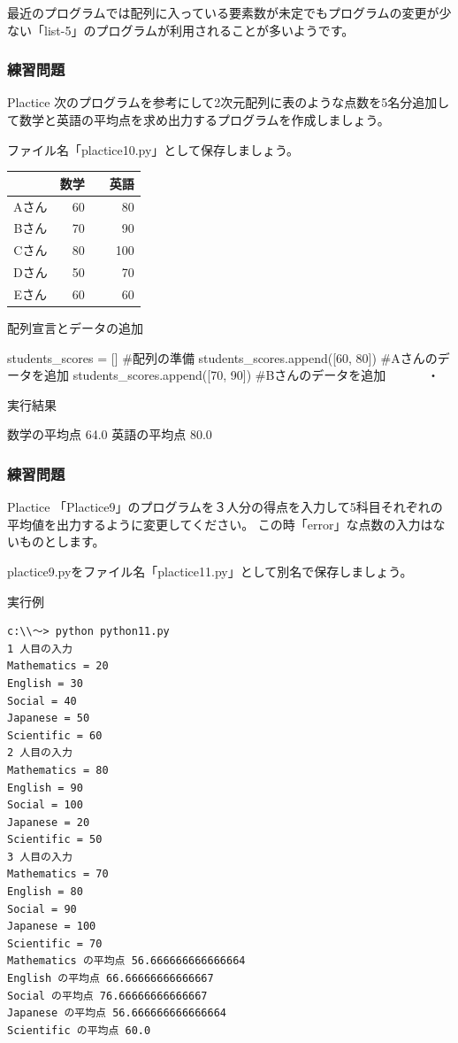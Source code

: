\documentclass[11pt,a4paper,dvipdfmx,titlepage]{jsreport}
\begin{document}
最近のプログラムでは配列に入っている要素数が未定でもプログラムの変更が少ない「list-5」のプログラムが利用されることが多いようです。
\subsubsection{練習問題}
\begin{plabox}{Plactice}
次のプログラムを参考にして2次元配列に表のような点数を5名分追加して数学と英語の平均点を求め出力するプログラムを作成しましょう。

ファイル名「plactice10.py」として保存しましょう。
\begin{center}
\begin{tabular}{|c|r|r|} 
\hline
 & 数学 &　英語 \\ \hline \hline
 Aさん &  60& 80  \\ \hline
 Bさん &  70& 90  \\ \hline
 Cさん &  80& 100  \\ \hline
 Dさん &  50& 70  \\ \hline
 Eさん &  60& 60  \\ \hline
\end{tabular}
\end{center}

\begin{codebox}{配列宣言とデータの追加}
\begin{listing}{1}
students_scores = []
#配列の準備
students_scores.append([60, 80]) #Aさんのデータを追加
students_scores.append([70, 90]) #Bさんのデータを追加
　　　・
\end{listing}
実行結果
\begin{listing}{1}
数学の平均点 64.0
英語の平均点 80.0
\end{listing}
\end{codebox}
\end{plabox}
\newpage
\subsubsection{練習問題}
\begin{plabox}{Plactice}
「Plactice9」のプログラムを３人分の得点を入力して5科目それぞれの平均値を出力するように変更してください。
この時「error」な点数の入力はないものとします。

plactice9.pyをファイル名「plactice11.py」として別名で保存しましょう。

\begin{codebox}{実行例}
\begin{verbatim}
c:\\～> python python11.py
1 人目の入力
Mathematics = 20
English = 30
Social = 40
Japanese = 50
Scientific = 60
2 人目の入力
Mathematics = 80
English = 90
Social = 100
Japanese = 20
Scientific = 50
3 人目の入力
Mathematics = 70
English = 80
Social = 90
Japanese = 100
Scientific = 70
Mathematics の平均点 56.666666666666664
English の平均点 66.66666666666667
Social の平均点 76.66666666666667
Japanese の平均点 56.666666666666664
Scientific の平均点 60.0
\end{verbatim}
\end{codebox}
\end{plabox}
\newpage
\end{document}
